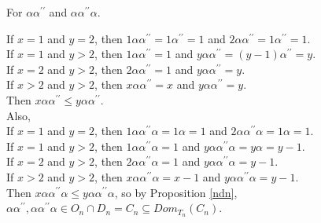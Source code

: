 \documentclass[10pt]{extarticle}
\numberwithin{equation}{section}
\numberwithin{bbb}{section}
\numberwithin{equation}{section}
\begin{document}
\vspace{0.3cm}
 For $\alpha\alpha^{\prime\prime}$ and $\alpha\alpha^{\prime\prime}\alpha$.
 
If $x=1$ and $y=2$, then $1\alpha\alpha^{\prime\prime}=1\alpha^{\prime\prime}=1$ and $2\alpha\alpha^{\prime\prime}=1\alpha^{\prime\prime}=1$.\\
If $x=1$ and $y>2$, then $1\alpha\alpha^{\prime\prime}=1$ and $y\alpha\alpha^{\prime\prime}=(y-1)\alpha^{\prime\prime}=y$.\\
If $x=2$ and $y>2$, then $2\alpha\alpha^{\prime\prime}=1$ and $y\alpha\alpha^{\prime\prime}=y$.\\
If $x>2$ and $y>2$, then $x\alpha\alpha^{\prime\prime}=x$ and $y\alpha\alpha^{\prime\prime}=y$.\\
Then $x\alpha\alpha^{\prime\prime} \leq y\alpha\alpha^{\prime\prime}$.\\
Also,\\
If $x=1$ and $y=2$, then $1\alpha\alpha^{\prime\prime}\alpha=1\alpha=1$ and $2\alpha\alpha^{\prime\prime}\alpha=1\alpha=1$.\\
If $x=1$ and $y>2$, then $1\alpha\alpha^{\prime\prime}\alpha=1$ and $y\alpha\alpha^{\prime\prime}\alpha=y\alpha=y-1$.\\
If $x=2$ and $y>2$, then $2\alpha\alpha^{\prime\prime}\alpha=1$ and $y\alpha\alpha^{\prime\prime}\alpha=y-1$.\\
If $x>2$ and $y>2$, then $x\alpha\alpha^{\prime\prime}\alpha=x-1$ and $y\alpha\alpha^{\prime\prime}\alpha=y-1$.\\
 Then $x\alpha\alpha^{\prime\prime}\alpha \leq y\alpha\alpha^{\prime\prime}\alpha$, so by Proposition \ref{ndn}, $\alpha\alpha^{\prime\prime}, \alpha\alpha^{\prime\prime}\alpha \in O_n \cap D_n=C_n \subseteq Dom_{T_{n}}(C_n)$.
\end{document}
